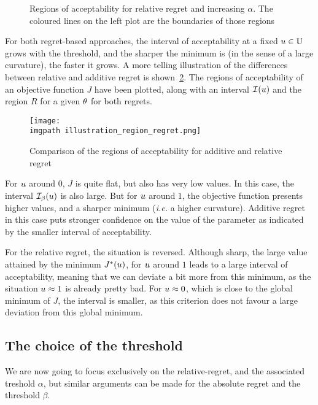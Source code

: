 \documentclass[../../Main_ManuscritThese.tex]{subfiles}
\newcommand\imgpath{/home/victor/acadwriting/Manuscrit/Text/Chapter3/img/}
\begin{document}
\begin{figure}[ht]
  \centering
  
  \caption[Regions of
  $\alpha$-acceptability]{\label{fig:gamma_alpha_increasing} Regions
    of acceptability for relative regret and increasing $\alpha$. The
    coloured lines on the left plot are the boundaries of those
    regions}
\end{figure}

For both regret-based approaches, the interval of acceptability at a
fixed $u\in\mathbb{U}$ grows with the threshold, and the sharper the minimum is
(in the sense of a large curvature), the faster it grows.  A more
telling illustration of the differences between relative and additive
regret is shown~\cref{fig:illustration_region_regret}.  The regions of
acceptability of an objective function $J$ have been plotted, along
with an interval $\mathcal{I}(u)$ and the region $R$ for a given
$\theta$ for both regrets.
\begin{figure}[ht]
  \centering
  \texttt{[image: \\imgpath illustration\_region\_regret.png]}
  \caption{\label{fig:illustration_region_regret} Comparison of the regions of acceptability for additive and relative regret}
\end{figure}
For $u$ around $0$, $J$ is quite flat, but also has very low
values. In this case, the interval $\mathcal{I}_{\beta}(u)$ is also
large. But for $u$ around $1$, the objective function presents
higher values, and a sharper minimum (\emph{i.e.} a higher
curvature). Additive regret in this case puts stronger confidence on
the value of the parameter as indicated by the smaller interval of
acceptability.

For the relative regret, the situation is reversed. Although sharp,
the large value attained by the minimum $J^*(u)$, for $u$ around
$1$ leads to a large interval of acceptability, meaning that we can
deviate a bit more from this minimum, as the situation $u \approx 1$
is already pretty bad. For $u \approx 0$, which is close to the
global minimum of $J$, the interval is smaller, as this criterion does
not favour a large deviation from this global minimum.



\subsection{The choice of the threshold}
\label{sec:choice_threshold}
We are now going to focus exclusively on the relative-regret, and the
associated treshold $\alpha$, but similar arguments can be made for
the absolute regret and the threshold $\beta$.
\end{document}

